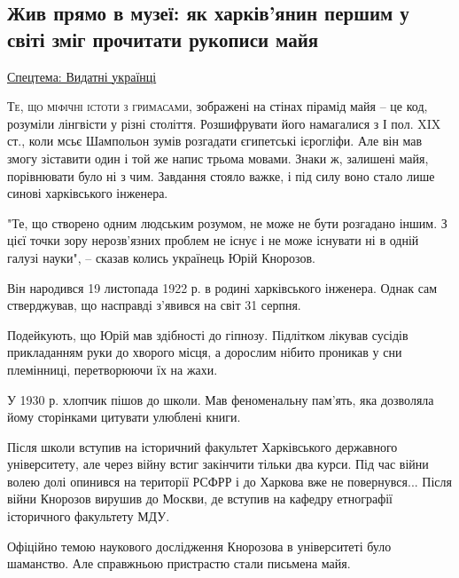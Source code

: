  
 
 

\subsection{Жив прямо в музеї: як харків'янин першим у світі зміг прочитати рукописи майя }
\href{https://www.5.ua/spetstemy/154}{Спецтема: Видатні українці}

\lettrine[lines=3]{Т}{е, що міфічні істоти з гримасами}, зображені на стінах пірамід майя – це
код, розуміли лінгвісти у різні століття. Розшифрувати його намагалися з І
пол. XIX ст., коли мсьє Шампольон зумів розгадати єгипетські ієрогліфи.
Але він мав змогу зіставити один і той же напис трьома мовами. Знаки ж,
залишені майя, порівнювати було ні з чим. Завдання стояло важке, і під
силу воно стало лише синові харківського інженера.

"Те, що створено одним людським розумом, не може не бути розгадано
іншим. З цієї точки зору нерозв'язних проблем не існує і не може
існувати ні в одній галузі науки", – сказав колись українець Юрій
Кнорозов.

Він народився 19 листопада 1922 р. в родині харківського інженера. Однак
сам стверджував, що насправді з'явився на світ 31 серпня.

Подейкують, що Юрій мав здібності до гіпнозу. Підлітком лікував сусідів
прикладанням руки до хворого місця, а дорослим нібито проникав у сни
племінниці, перетворюючи їх на жахи.

У 1930 р. хлопчик пішов до школи. Мав феноменальну пам'ять, яка дозволяла
йому сторінками цитувати улюблені книги.

Після школи вступив на історичний факультет Харківського державного
університету, але через війну встиг закінчити тільки два курси. Під час
війни волею долі опинився на території РСФРР і до Харкова вже не
повернувся... Після війни Кнорозов вирушив до Москви, де вступив на
кафедру етнографії історичного факультету МДУ.

Офіційно темою наукового дослідження Кнорозова в університеті було
шаманство. Але справжньою пристрастю стали письмена майя.

